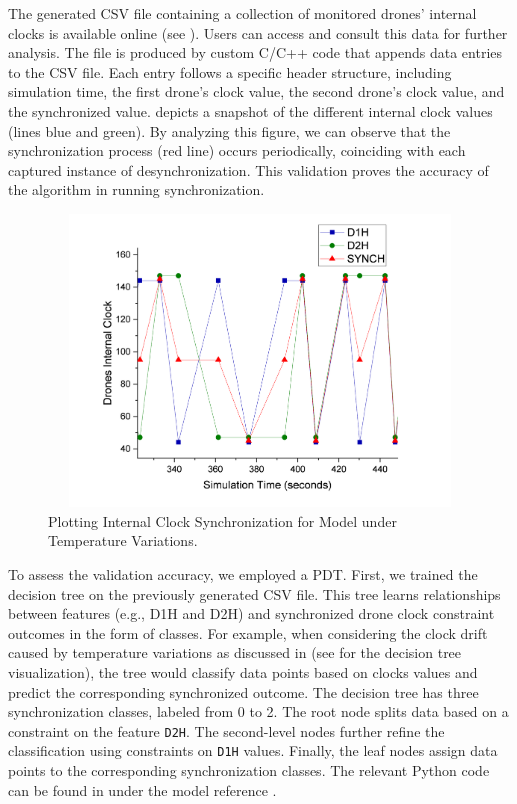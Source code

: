The generated CSV file containing a collection of monitored drones' internal clocks is available online (see \cite{csi2023}). Users can access and consult this data for further analysis. The file is produced by custom C/C++ code that appends data entries to the CSV file. Each entry follows a specific header structure, including simulation time, the first drone's clock value, the second drone's clock value, and the synchronized value.  depicts a snapshot of the different internal clock values (lines blue and green). By analyzing this figure, we can observe that the synchronization process (red line) occurs periodically, coinciding with each captured instance of desynchronization. This validation proves the accuracy of the algorithm in running synchronization.

\noindent
\begin{figure}[!htbp]
    \centering
    		\includegraphics[width=340pt, height =220pt]{GraphDrones.pdf}
    \caption{Plotting Internal Clock Synchronization for Model under Temperature Variations.}
    \label{fig:usecase:cranes:graphic:plot:synch}
\end{figure} 



To assess the validation accuracy, we employed a PDT. First, we trained the decision tree on the previously generated CSV file. This tree learns relationships between features (e.g., D1H and D2H) and synchronized drone clock constraint outcomes in the form of classes. For example, when considering the clock drift caused by temperature variations as discussed in \cite{WEBSTER2020101183} (see  for the decision tree visualization), the tree would classify data points based on clocks values and predict the corresponding synchronized outcome. The decision tree has three synchronization classes, labeled from 0 to 2. The root node splits data based on a constraint on the feature \texttt{D2H}. The second-level nodes further refine the classification using constraints on \texttt{D1H} values. Finally, the leaf nodes assign data points to the corresponding synchronization classes. The relevant Python code can be found in \cite{csi2023} under the model reference . 

